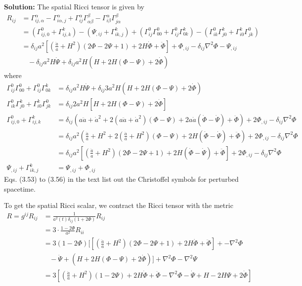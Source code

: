 \documentclass[11pt]{article}
\begin{document}
\textbf{Solution:}
The spatial Ricci tensor is given by 
\begin{align*}
    R_{ij} &= \Gamma^\alpha_{ij, \alpha} - \Gamma^\alpha_{i\alpha, j} + \Gamma^\alpha_{ij} \Gamma^\beta_{\alpha\beta} - \Gamma^\alpha_{i\beta}\Gamma^\beta_{j\alpha} \\
    &= (\Gamma^0_{ij,0} + \Gamma^k_{ij,k}) - (\Psi_{,ij} + \Gamma^k_{ik,j}) + (\Gamma^0_{ij}\Gamma^0_{00} + \Gamma^0_{ij}\Gamma^k_{0k}) - (\Gamma^0_{ik}\Gamma^k_{j0} + \Gamma^k_{i0}\Gamma^0_{jk}) \\
    &=\delta_{ij}a^2 [(\frac{\ddot{a}}{a} + H^2)(2 \Phi - 2\Psi +1) + 2H\dot{\Phi} + \ddot{\Phi}]+ \Phi_{,ij} - \delta_{ij}\nabla^2 \Phi - \Psi_{,ij} \\
    &~~~~- \delta_{ij} a^2H \dot{\Psi} + \delta_{ij}a^2H (H + 2H(\Phi - \Psi) + 2\dot{\Phi})
\end{align*}
where 
\begin{align*}
    \Gamma^0_{ij}\Gamma^0_{00} + \Gamma^0_{ij}\Gamma^k_{0k} &= \delta_{ij} a^2H \dot{\Psi} + \delta_{ij}3a^2H (H + 2H(\Phi - \Psi) + 2\dot{\Phi}) \\
    \Gamma^0_{ik}\Gamma^k_{j0} + \Gamma^k_{i0}\Gamma^0_{jk} &= \delta_{ij}2a^2H[H + 2H(\Phi - \Psi) + 2\dot{\Phi}] \\
    \Gamma^0_{ij,0} + \Gamma^k_{ij,k} &= \delta_{ij} (a\ddot{a} + \dot{a}^2 + 2(a\ddot{a} + \dot{a}^2)(\Phi - \Psi) + 2a\dot{a}(\dot{\Phi} - \dot{\Psi}) + \ddot{\Phi}) + 2\Phi_{,ij} - \delta_{ij}\nabla^2 \Phi  \\
    &= \delta_{ij} a^2(\frac{\ddot{a}}{a} + H^2 + 2(\frac{\ddot{a}}{a} + H^2)(\Phi - \Psi) + 2H(\dot{\Phi} - \dot{\Psi}) + \ddot{\Phi}) + 2 \Phi_{,ij} - \delta_{ij}\nabla^2 \Phi \\
    &= \delta_{ij}a^2 [(\frac{\ddot{a}}{a} + H^2)(2 \Phi - 2\Psi +1) + 2H(\dot{\Phi} - \dot{\Psi}) + \ddot{\Phi}]+ 2 \Phi_{,ij} - \delta_{ij}\nabla^2 \Phi  \\
    \Psi_{,ij} + \Gamma^k_{ik,j} &= \Psi_{,ij} + \Phi_{,ij}
\end{align*}
Eqs. (3.53) to (3.56) in the text list out the Christoffel symbols for perturbed spacetime. 

To get the spatial Ricci scalar, we contract the Ricci tensor with the metric 
\begin{align*}
    R = g^{ij}R_{ij} &= \frac{1}{a^2(t) \delta_{ij} (1+2\Phi)}R_{ij} \\
    &= 3 \cdot \frac{1-2\Phi}{a^2} R_{ii} \\
    &= 3 (1 - 2\Phi)\Bigg[ [(\frac{\ddot{a}}{a} + H^2)(2 \Phi - 2\Psi +1) + 2H\dot{\Phi} + \ddot{\Phi}]+ - \nabla^2 \Phi \\
    &~~~~-\dot{\Psi} +  (H + 2H(\Phi - \Psi) + 2\dot{\Phi})\Bigg] + \nabla^2 \Phi - \nabla^2 \Psi \\
    &= 3 \left[ (\frac{\ddot{a}}{a} + H^2)(1 - 2\Psi) + 2H \dot{\Phi} + \ddot{\Phi} - \nabla^2 \Phi - \dot{\Psi} + H - 2H\Psi + 2\dot{\Phi} \right] 
\end{align*}
\end{document}
